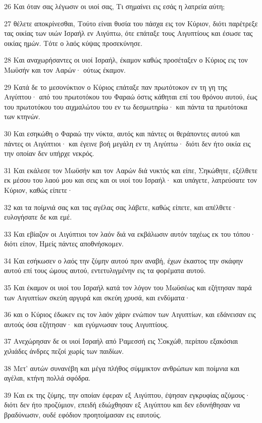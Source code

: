 \par 26 Και όταν σας λέγωσιν οι υιοί σας, Τι σημαίνει εις εσάς η λατρεία αύτη;
\par 27 θέλετε αποκρίνεσθαι, Τούτο είναι θυσία του πάσχα εις τον Κύριον, διότι παρέτρεξε τας οικίας των υιών Ισραήλ εν Αιγύπτω, ότε επάταξε τους Αιγυπτίους και έσωσε τας οικίας ημών. Τότε ο λαός κύψας προσεκύνησε.
\par 28 Και αναχωρήσαντες οι υιοί Ισραήλ, έκαμον καθώς προσέταξεν ο Κύριος εις τον Μωϋσήν και τον Ααρών· ούτως έκαμον.
\par 29 Κατά δε το μεσονύκτιον ο Κύριος επάταξε παν πρωτότοκον εν τη γη της Αιγύπτου· από του πρωτοτόκου του Φαραώ όστις κάθηται επί του θρόνου αυτού, έως του πρωτοτόκου του αιχμαλώτου του εν τω δεσμωτηρίω· και πάντα τα πρωτότοκα των κτηνών.
\par 30 Και εσηκώθη ο Φαραώ την νύκτα, αυτός και πάντες οι θεράποντες αυτού και πάντες οι Αιγύπτιοι· και έγεινε βοή μεγάλη εν τη Αιγύπτω· διότι δεν ήτο οικία εις την οποίαν δεν υπήρχε νεκρός.
\par 31 Και εκάλεσε τον Μωϋσήν και τον Ααρών διά νυκτός και είπε, Σηκώθητε, εξέλθετε εκ μέσου του λαού μου και σεις και οι υιοί του Ισραήλ· και υπάγετε, λατρεύσατε τον Κύριον, καθώς είπετε·
\par 32 και τα ποίμνιά σας και τας αγέλας σας λάβετε, καθώς είπετε, και απέλθετε· ευλογήσατε δε και εμέ.
\par 33 Και εβίαζον οι Αιγύπτιοι τον λαόν διά να εκβάλωσιν αυτόν ταχέως εκ του τόπου· διότι είπον, Ημείς πάντες αποθνήσκομεν.
\par 34 Και εσήκωσεν ο λαός την ζύμην αυτού πριν αναβή, έχων έκαστος την σκάφην αυτού επί τους ώμους αυτού, εντετυλιγμένην εις τα φορέματα αυτού.
\par 35 Και έκαμον οι υιοί του Ισραήλ κατά τον λόγον του Μωϋσέως και εζήτησαν παρά των Αιγυπτίων σκεύη αργυρά και σκεύη χρυσά, και ενδύματα·
\par 36 και ο Κύριος έδωκεν εις τον λαόν χάριν ενώπιον των Αιγυπτίων, και εδάνεισαν εις αυτούς όσα εζήτησαν· και εγύμνωσαν τους Αιγυπτίους.
\par 37 Ανεχώρησαν δε οι υιοί Ισραήλ από Ραμεσσή εις Σοκχώθ, περίπου εξακόσιαι χιλιάδες άνδρες πεζοί χωρίς των παιδίων.
\par 38 Μετ' αυτών συνανέβη και μέγα πλήθος σύμμικτον ανθρώπων και ποίμνια και αγέλαι, κτήνη πολλά σφόδρα.
\par 39 Και εκ της ζύμης, την οποίαν έφεραν εξ Αιγύπτου, έψησαν εγκρυφίας αζύμους· διότι δεν ήτο προζύμιον, επειδή εδιώχθησαν εξ Αιγύπτου και δεν εδυνήθησαν να βραδύνωσιν, ουδέ εφόδιον προητοίμασαν εις εαυτούς.
